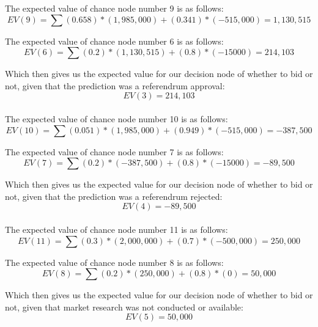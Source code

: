 \documentclass{article}
\begin{document}
 The expected value of chance node number 9 is as follows: 
\[
EV(9) = \sum (0.658) * (1,985,000) + (0.341) * (-515,000) = 1,130,515
\]

 The expected value of chance node number 6 is as follows: 
\[
EV(6) = \sum (0.2) * (1,130,515) + (0.8) * (-15000) = 214,103
\]

 Which then gives us the expected value for our decision node of whether to bid or not, given that the prediction was a referendrum approval: 
\[
EV(3) = 214,103
\] \\


 The expected value of chance node number 10 is as follows: 
\[
EV(10) = \sum (0.051) * (1,985,000) + (0.949) * (-515,000) = -387,500
\]

 The expected value of chance node number 7 is as follows: 
\[
EV(7) = \sum (0.2) * (-387,500) + (0.8) * (-15000) = -89,500
\]

 Which then gives us the expected value for our decision node of whether to bid or not, given that the prediction was a referendrum rejected: 
\[
EV(4) = -89,500
\] \\


 The expected value of chance node number 11 is as follows: 
\[
EV(11) = \sum (0.3) * (2,000,000) + (0.7) * (-500,000) = 250,000
\]

 The expected value of chance node number 8 is as follows: 
\[
EV(8) = \sum (0.2) * (250,000) + (0.8) * (0) = 50,000
\]

 Which then gives us the expected value for our decision node of whether to bid or not, given that market research was not conducted or available: 
\[
EV(5) = 50,000
\] \\
\end{document}
